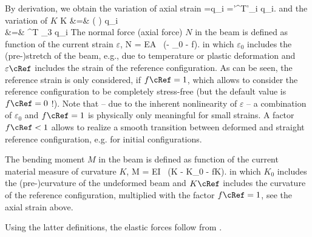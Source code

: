     By derivation, we obtain the variation of axial strain
    \be \label{eq:cable2D:deltaEpsilon}
    \delta \varepsilon =\delta q_i
    	=\rv'^{T}\Sm'_i \delta q_i.
    \ee
    and the variation of $K$
    \bea \label{eq:cable2D:deltaKappa}
    \delta K &=&  \left( \right) \delta q_i\nonumber\\
       &=&  ^{T} \ev_3 \delta q_i
    \eea
    The normal force (axial force) $N$ in the beam is defined as function of the current strain $\varepsilon$,
    \be \label{eq_N}
      N = EA \, (\varepsilon - \varepsilon_0 - f\cRef \cdot \varepsilon\cRef).
    \ee
    in which $\varepsilon_0$ includes the (pre-)stretch of the beam, e.g., due to temperature or plastic deformation and 
    $\varepsilon\cRef$ includes the strain of the reference configuration.
    As can be seen, the reference strain is only considered, if $f\cRef=1$, which allows to consider the reference configuration to be
    completely stress-free (but the default value is $f\cRef=0$ !).
    Note that -- due to the inherent nonlinearity of $\varepsilon$ -- a combination of $\varepsilon_0$ and $f\cRef=1$ is physically only meaningful for small strains.
    A factor $f\cRef<1$ allows to realize a smooth transition between deformed and straight reference configuration, e.g. for initial configurations.

    The bending moment $M$ in the beam is defined as function of the current material measure of curvature $K$,
    \be \label{eq_M}
      M = EI \, (K - K_0 - f\cRef \cdot K\cRef).
    \ee
    in which $K_0$ includes the (pre-)curvature of the undeformed beam and
    $K\cRef$ includes the curvature of the reference configuration, multiplied with the factor $f\cRef=1$, see the axial strain above.

    Using the latter definitions, the elastic forces follow from .
    
